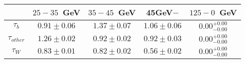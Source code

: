 \begin{table}
\footnotesize
\caption{}
\centering
\begin{tabular}{|c|c|c|c|c|} \hline
 & $25-35$~GeV & $35-45$~GeV & 45GeV$-$ & $125-0$~GeV\\\hline
$\tau_{b}$ & $0.91\pm0.06$ & $1.37\pm0.07$ & $1.06\pm0.06$ & $0.00^{+0.00}_{-0.00}$\\\hline
$\tau_{other}$ & $1.26\pm0.02$ & $0.92\pm0.02$ & $0.92\pm0.03$ & $0.00^{+0.00}_{-0.00}$\\\hline
$\tau_{W}$ & $0.83\pm0.01$ & $0.82\pm0.02$ & $0.56\pm0.02$ & $0.00^{+0.00}_{-0.00}$\\\hline
\end{tabular}
\label{tab:scale_factor}
\end{table}
